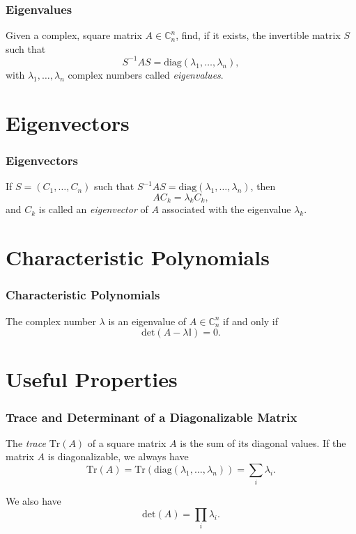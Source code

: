 \documentclass{beamer}
\begin{document}
\begin{frame}
\frametitle{Eigenvalues}

Given a complex, square matrix $A \in \mathbb{C}^n_n$, find, if it exists, the invertible matrix $S$ such that 
$$
S^{-1} A S = \textrm{diag} \left( \lambda_1, \ldots, \lambda_n \right),
$$
with $ \lambda_1, \ldots, \lambda_n $ complex numbers called \textit{eigenvalues}.

\vfill

\end{frame}


\section{Eigenvectors} 

\begin{frame}
\frametitle{Eigenvectors}

If $S = (C_1, \ldots, C_n)$ such that $S^{-1} A S = \textrm{diag} \left( \lambda_1, \ldots, \lambda_n \right)$, then 
$$
A C_k = \lambda_k C_k,
$$
and $C_k$ is called an \textit{eigenvector} of $A$ associated with the eigenvalue $\lambda_k$.

\vfill

\end{frame}


\section{Characteristic Polynomials} 

\begin{frame}
\frametitle{Characteristic Polynomials}

The complex number $\lambda$ is an eigenvalue of $A \in \mathbb{C}^n_n$ if and only if
$$
\textrm{det} \left( A - \lambda \mathbb{I} \right) = 0.
$$

\vfill

\end{frame}



\section{Useful Properties } 


\begin{frame}
\frametitle{Trace and Determinant of a Diagonalizable Matrix}

The \textit{trace} $\textrm{Tr}(A)$ of a square matrix $A$ is the sum of its diagonal values. If the matrix $A$ is diagonalizable, we always have
$$
\textrm{Tr}(A) = \textrm{Tr} \left(  \textrm{diag} \left( \lambda_1, \ldots, \lambda_n \right) \right) = \sum_i \lambda_i.
$$

We also have
$$
\textrm{det}(A) = \prod_i \lambda_i.
$$

\vfill

\end{frame}

\end{document}
